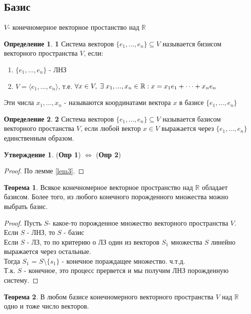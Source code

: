 \documentclass[a4paper, 12pt]{article}
\newcommand{\R}{\mathbb R}
\newcommand\tab[1][.5cm]{\hspace*{#1}}
\theoremstyle{definition}
\newtheorem*{definition}{Определение}
\newtheorem*{theorem}{Теорема}%
\newtheorem*{subtheorem}{Утверждение}
\begin{document}
\subsection{Базис}
$V$- конечномерное векторное простанство над $\R$ 
\begin{definition}\tab[-0.1cm]\textbf{1} 
  Система векторов $\{e_1,...,e_n\}\subseteq V$ называется бизисом векторного пространства $V$, если:
  \begin{enumerate}
    \item $\{e_1,...,e_n\}$ - ЛНЗ
    \item $V = \langle e_1,...,e_n \rangle$, т.е. $\forall x \in V, \tab[0.1cm] \exists \tab[0.1cm] x_1,...,x_n \in \R: x = x_1e_1+\cdots + x_ne_n$  
  \end{enumerate}
  Эти числа $x_1,...,x_n$ - называются координатами вектора $x$ в базисе $\{e_1,...,e_n\}$ 
\end{definition} 
\begin{definition}\tab[-0.1cm]\textbf{2} 
  Система векторов $\{e_1,...,e_n\} \subseteq V$ называется базисом векторного простанства $V$, если любой вектор $x \in V$ выражается через $\{e_1,...,e_n\}$ единственным образом.
\end{definition} 
  \begin{subtheorem}
    (\textbf{Опр 1}) $\Longleftrightarrow $ (\textbf{Опр 2})
  \end{subtheorem} 
  \begin{proof}
    По лемме \eqref{lem3}.
  \end{proof}
  \begin{theorem}
    Всякое конечномерное векторное пространство над $\R$ обладает базисом. Более того, из любого конечного порожденного множества можно выбрать базис.
  \end{theorem} 
  \begin{proof}
    Пусть $S$- какое-то порожденное множество векторного пространства $V$. \\
    Если $S$ - ЛНЗ, то $S$ - базис \\
    Если $S$ - ЛЗ, то по критерию о ЛЗ один из векторов $S_1$ множества $S$ линейно выражается через остальные. \\
    Тогда $S_1$ = $S\setminus\{s_1\}$ - конечное пораждащее множество. ч.т.д. \\
    Т.к. $S$ - конечное, это процесс прервется и мы получим ЛНЗ порожденную систему.
  \end{proof} 
  \begin{theorem}
    В любом базисе конечномерного векторного пространства $V$ над $\R$ одно и тоже число векторов.
  \end{theorem} 
\end{document}
